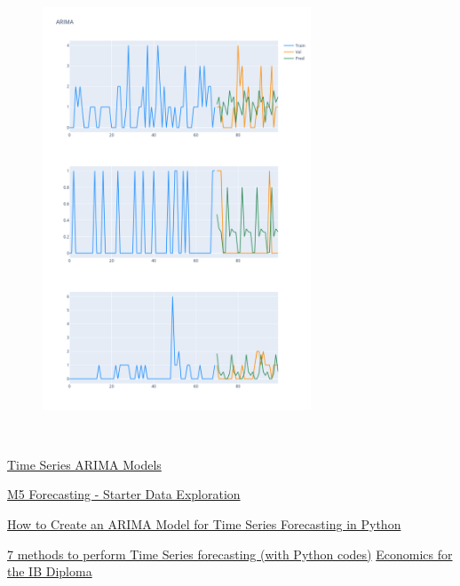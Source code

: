\documentclass{article}
\begin{document}
\begin{figure}[hbt!]
	\centering
	\includegraphics[width=\textwidth,height=12cm]{Outputs/36.png}
\end{figure}
\ \\
\begin{flushleft}
	\begin{latin}
		\begin{thebibliography}{9}
			\href{https://sites.google.com/site/econometricsacademy/econometrics-models/time-series-arima-models}{Time Series ARIMA Models}
			
			\href{https://www.kaggle.com/robikscube/m5-forecasting-starter-data-exploration}{M5 Forecasting - Starter Data Exploration}
			
			\href{https://machinelearningmastery.com/arima-for-time-series-forecasting-with-python/}{How to Create an ARIMA Model for Time Series Forecasting in Python}
			
			\href{https://www.analyticsvidhya.com/blog/2018/02/time-series-forecasting-methods/}{7 methods to perform Time Series forecasting (with Python codes)}
			\href{https://www.cambridge.org/core/books/economics-for-the-ib-diploma/1918CF16A8FC979AAB19951A487DCB1C}{Economics for the IB Diploma}
		\end{thebibliography}
	\end{latin}
\end{flushleft}
\end{document}
